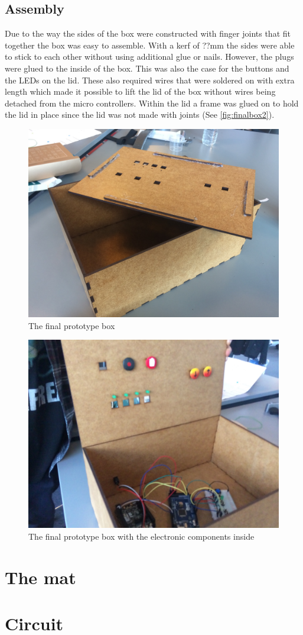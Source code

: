 		
	\subsection{Assembly}
	Due to the way the sides of the box were constructed with finger joints that fit together the box was easy to assemble. With a kerf of ??mm the sides were able to stick to each other without using additional glue or nails. However, the plugs were glued to the inside of the box. This was also the case for the buttons and the LEDs on the lid. These also required wires that were soldered on with extra length which made it possible to lift the lid of the box without wires being detached from the micro controllers. Within the lid a frame was glued on to hold the lid in place since the lid was not made with joints (See \autoref{fig:finalbox2}).
	
		\begin{figure}[H]
			\centering
			\includegraphics[width=0.7\linewidth]{figure/Design/finalbox2}
			\caption{The final prototype box}
			\label{fig:finalbox2}
		\end{figure}
		
		\begin{figure}[H]
			\centering
			\includegraphics[width=0.7\linewidth]{figure/Design/finalbox3}
			\caption{The final prototype box with the electronic components inside}
			\label{fig:finalbox3}
		\end{figure}

\section{The mat}%

\section{Circuit}